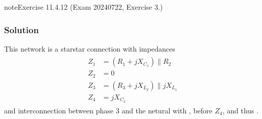 \documentclass[letterpaper,10pt,english]{jupyterBook}
\begin{document}
\begin{sphinxadmonition}{note}{Exercise 11.4.12 (Exam 2024\sphinxhyphen{}07\sphinxhyphen{}22, Exercise 3.)}



\begin{figure}[htbp]
\centering

\noindent{}
\end{figure}
\subsubsection*{Solution}

\sphinxAtStartPar
This network is a star\sphinxhyphen{}star connection with impedances
\begin{equation*}
\begin{split}\begin{aligned}
  Z_1 & = ( R_1 + j X_{C_1} ) \parallel R_2 \\
  Z_2 & = 0 \\
  Z_3 & = ( R_3 + j X_{L_2} ) \parallel j X_{L_1} \\
  Z_4 & = j X_{C_2}
\end{aligned}\end{split}
\end{equation*}
\sphinxAtStartPar
and inter\sphinxhyphen{}connection between phase \(3\) and the netural with , before \(Z_4\), and thus .


\end{sphinxadmonition}
\end{document}

